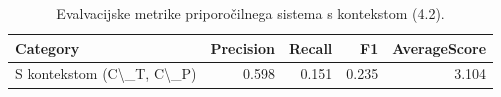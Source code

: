 \begin{table}[h]
\centering
\caption{Evalvacijske metrike priporočilnega sistema s kontekstom (4.2).}
\label{tab:evaluation_metrics_4_2}
\begin{tabular}{lrrrr}
\toprule
Category & Precision & Recall & F1 & AverageScore \\
\midrule
S kontekstom (C\textbackslash \_T, C\textbackslash \_P) & 0.598 & 0.151 & 0.235 & 3.104 \\
\bottomrule
\end{tabular}

\end{table}
